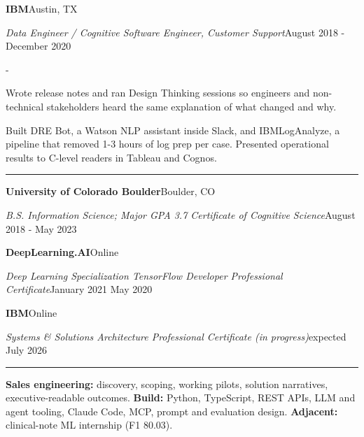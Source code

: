 \documentclass[10pt,letterpaper]{article}
\newenvironment{cvitems}{%
  \begin{list}{-}{%
    \setlength{\leftmargin}{12pt}%
    \setlength{\itemsep}{1.2pt}%
    \setlength{\parsep}{0pt}%
    \setlength{\topsep}{1.5pt}%
    \setlength{\partopsep}{0pt}%
    \setlength{\labelwidth}{6pt}%
    \setlength{\labelsep}{6pt}%
    \setlength{\itemindent}{0pt}%
  }%
}{\end{list}}
\newcommand{\cvsection}[1]{%
  \vspace{7pt}%
  \noindent{\bfseries\fontsize{11pt}{13pt}\selectfont\MakeUppercase{#1}}\par
  \vspace{1pt}%
  \noindent\rule{\textwidth}{0.4pt}\par
  \vspace{4pt}%
}
\newcommand{\cventryhead}[4]{%
  \noindent\textbf{#1}\hfill#2\par
  \vspace{0.5pt}%
  \noindent\textit{#3}\hfill#4\par
}
\newcommand{\cveduhead}[4]{%
  \noindent\textbf{#1}\hfill#2\par
  \vspace{0.5pt}%
  \noindent\textit{#3}\hfill#4\par
}
\begin{document}
\vspace{3pt}
\cventryhead{IBM}{Austin, TX}
{Data Engineer / Cognitive Software Engineer, Customer Support}{August 2018 - December 2020}
\begin{cvitems}
  \item Wrote release notes and ran Design Thinking sessions so engineers and non-technical stakeholders heard the same explanation of what changed and why.
  \item Built DRE Bot, a Watson NLP assistant inside Slack, and IBMLogAnalyze, a pipeline that removed 1-3 hours of log prep per case. Presented operational results to C-level readers in Tableau and Cognos.
\end{cvitems}

\cvsection{Education}

\cveduhead{University of Colorado Boulder}{Boulder, CO}
{B.S. Information Science; Major GPA 3.7 \textbar{} Certificate of Cognitive Science}{August 2018 - May 2023}

\vspace{3pt}
\cveduhead{DeepLearning.AI}{Online}
{Deep Learning Specialization \textbar{} TensorFlow Developer Professional Certificate}{January 2021 \textbar{} May 2020}

\vspace{3pt}
\cveduhead{IBM}{Online}
{Systems \& Solutions Architecture Professional Certificate (in progress)}{expected July 2026}

\cvsection{Skills}

{\raggedright
\noindent\textbf{Sales engineering:} discovery, scoping, working pilots, solution narratives, executive-readable outcomes. \textbf{Build:} Python, TypeScript, REST APIs, LLM and agent tooling, Claude Code, MCP, prompt and evaluation design. \textbf{Adjacent:} clinical-note ML internship (F1 80.03).\par
}
\end{document}

